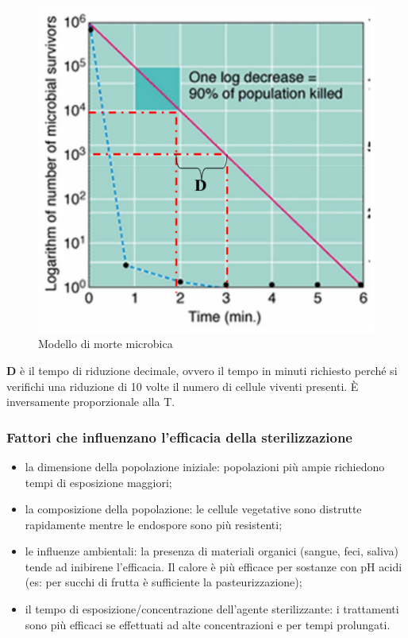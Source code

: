 \documentclass[11pt]{book}
\begin{document}
\clearpage
\begin{figure}[htp]
\centering
\includegraphics[scale=0.5]{img/Modello di morte microbica.png}
\caption{Modello di morte microbica}
\label{}
\end{figure}


\textbf{D} è il tempo di riduzione decimale, ovvero il tempo in minuti richiesto perché si verifichi una riduzione di 10 volte il numero di cellule viventi presenti. \`E inversamente proporzionale alla T.

\subsubsection{Fattori che influenzano l’efficacia della sterilizzazione}
\begin{itemize}
\item la dimensione della popolazione iniziale: popolazioni più ampie richiedono tempi di esposizione maggiori;
\item la composizione della popolazione: le cellule vegetative sono distrutte rapidamente mentre le endospore sono più resistenti;
\item le influenze ambientali: la presenza di materiali organici (sangue, feci, saliva) tende ad inibirene l’efficacia. Il calore è più efficace per sostanze con pH acidi (es: per succhi di frutta è sufficiente la pasteurizzazione);
\item il tempo di esposizione/concentrazione dell’agente sterilizzante: i trattamenti sono più efficaci se effettuati ad alte concentrazioni e per tempi prolungati. 
\end{itemize}
\end{document}
